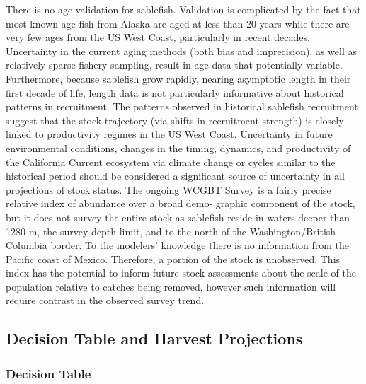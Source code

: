 \documentclass[11pt,
  english,
  a4paper,
]{article}
\begin{document}
There is no age validation for sablefish. Validation is complicated by the fact that most known-age fish from Alaska are aged at less than 20 years while there are very few ages from the US West Coast, particularly in recent decades. Uncertainty in the current aging methods (both bias and imprecision), as well as relatively sparse fishery sampling, result in age data that potentially variable. Furthermore, because sablefish grow rapidly, nearing asymptotic length in their first decade of life, length data is not particularly informative about historical patterns in recruitment. The patterns observed in historical sablefish recruitment suggest that the stock trajectory (via shifts in recruitment strength) is closely linked to productivity regimes in the US West Coast. Uncertainty in future environmental conditions, changes in the timing, dynamics, and productivity of the California Current ecosystem via climate change or cycles similar to the historical period should be considered a significant source of uncertainty in all projections of stock status. The ongoing WCGBT Survey is a fairly precise relative index of abundance over a broad demo- graphic component of the stock, but it does not survey the entire stock as sablefish reside in waters deeper than 1280 m, the survey depth limit, and to the north of the Washington/British Columbia border. To the modelers' knowledge there is no information from the Pacific coast of Mexico. Therefore, a portion of the stock is unobserved. This index has the potential to inform future stock assessments about the scale of the population relative to catches being removed, however such information will require contrast in the observed survey trend.

\leavevmode\tagmcend\tagstructend\par


\hypertarget{decision-table-and-harvest-projections}{%
\subsection*{Decision Table and Harvest Projections}\label{decision-table-and-harvest-projections}}

\leavevmode\tagmcend\tagstructend


\hypertarget{decision-table}{%
\subsubsection*{Decision Table}\label{decision-table}}
\end{document}
